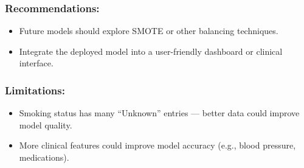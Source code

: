 \documentclass[
]{article}
\providecommand{\tightlist}{%
  \setlength{\itemsep}{0pt}\setlength{\parskip}{0pt}}
\begin{document}
\subsubsection{Recommendations:}\label{recommendations}

\begin{itemize}
\tightlist
\item
  Future models should explore SMOTE or other balancing techniques.
\item
  Integrate the deployed model into a user-friendly dashboard or
  clinical interface.
\end{itemize}

\subsubsection{Limitations:}\label{limitations}

\begin{itemize}
\tightlist
\item
  Smoking status has many ``Unknown'' entries --- better data could
  improve model quality.
\item
  More clinical features could improve model accuracy (e.g., blood
  pressure, medications).
\end{itemize}
\end{document}
